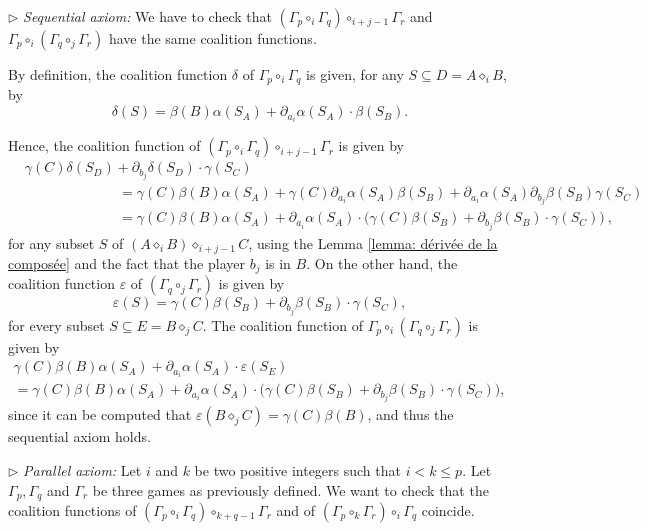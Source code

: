 \documentclass[a4paper,12pt]{amsart}
\begin{document}
\medskip

$\triangleright$ \emph{Sequential axiom:} 
We have to check that $\left( \Gamma_p \circ_{i} \Gamma_q \right) \circ_{i+j-1} \Gamma_r$ and $\Gamma_p \circ_i \left( \Gamma_q \circ_j \Gamma_r \right)$ have the same coalition functions. 

\medskip

By definition, the coalition function $\delta$ of $\Gamma_p \circ_i \Gamma_q$ is given, for any $S \subseteq D = A \diamond_i B$, by 
\[
\delta(S) = \beta(B)\alpha(S_A) + \partial_{a_i} \alpha(S_A) \cdot \beta(S_B). 
\]

Hence, the coalition function of $\left(\Gamma_p \circ_i \Gamma_q\right) \circ_{i+j-1} \Gamma_r$ is given by 
\[ 
\begin{aligned} 
&\gamma(C)\delta(S_D) + \partial_{b_j} \delta(S_D) \cdot \gamma(S_C) \\
& \hspace{80pt} = \gamma(C)\beta(B)\alpha(S_A) + \gamma(C)\partial_{a_i} \alpha(S_A) \beta(S_B) + \partial_{a_i} \alpha(S_A) \partial_{b_j} \beta(S_B) \gamma(S_C) \\
& \hspace{80pt} = \gamma(C)\beta(B)\alpha(S_A) + \partial_{a_i} \alpha(S_A) \cdot \Big( \gamma(C)\beta(S_B) + \partial_{b_j} \beta(S_B) \cdot \gamma(S_C) \Big)~,
\end{aligned} 
\]
for any subset $S$ of $(A \diamond_i B) \diamond_{i+j-1} C$, using the Lemma \ref{lemma: dérivée de la composée} and the fact that the player $b_j$ is in $B$. On the other hand, the coalition function $\varepsilon$ of $\left( \Gamma_q \circ_j \Gamma_r \right)$ is given by 
\[
\varepsilon(S) = \gamma(C)\beta(S_B) + \partial_{b_j} \beta(S_B) \cdot \gamma(S_C), 
\]
for every subset $S \subseteq E = B \diamond_j C$. The coalition function of $\Gamma_p \circ_i \left( \Gamma_q \circ_j \Gamma_r \right)$ is given by 
\begin{multline*}
\gamma(C)\beta(B)\alpha(S_A) + \partial_{a_i} \alpha(S_A) \cdot \varepsilon(S_E) \\ = \gamma(C)\beta(B)\alpha(S_A) + \partial_{a_i} \alpha(S_A) \cdot \Big( \gamma(C)\beta(S_B) + \partial_{b_j} \beta(S_B) \cdot \gamma(S_C) \Big),  
\end{multline*}
since it can be computed that $\varepsilon(B \diamond_j C) = \gamma(C)\beta(B)$, and thus the sequential axiom holds.

\medskip 

$\triangleright$ \emph{Parallel axiom:} Let $i$ and $k$ be two positive integers such that $i < k \leq p$. Let $\Gamma_p, \Gamma_q$ and $\Gamma_r$ be three games as previously defined. We want to check that the coalition functions of $\left(\Gamma_p \circ_i \Gamma_q \right) \circ_{k+q-1} \Gamma_r$ and of $\left( \Gamma_p \circ_k \Gamma_r \right) \circ_i \Gamma_q$ coincide. 
\end{document}
